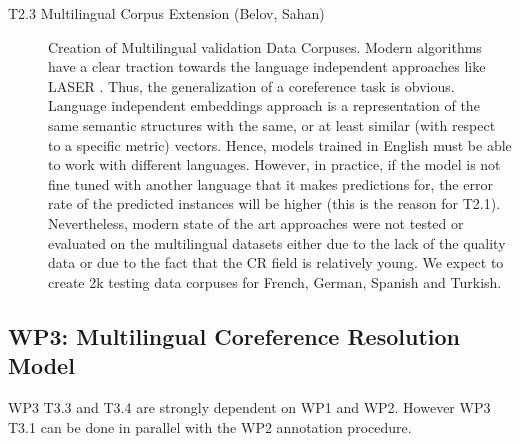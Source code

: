 \begin{description}
	\item [T2.3 Multilingual Corpus Extension (Belov, Sahan)] Creation of Multilingual validation Data Corpuses. 
Modern algorithms have a clear traction towards the language independent approaches like LASER \cite{artetxe2019massively}. Thus, the generalization of a coreference task is obvious. Language independent embeddings approach is a representation of the same semantic structures with the same, or at least similar (with respect to a specific metric) vectors. Hence, models trained in English must be able to work with different languages. However, in practice, if the model is not fine tuned with another language that it makes predictions for, the error rate of the predicted instances will be higher (this is the reason for T2.1). Nevertheless, modern state of the art approaches were not tested or evaluated on the multilingual datasets either due to the lack of the quality data or due to the fact that the CR field is relatively young. We expect to create 2k testing data corpuses for French, German, Spanish and Turkish. 

\end{description}


\subsection*{WP3: Multilingual Coreference Resolution Model}

WP3 T3.3 and T3.4  are strongly dependent on WP1 and WP2. However WP3 T3.1 can be done in parallel with the WP2 annotation procedure.


